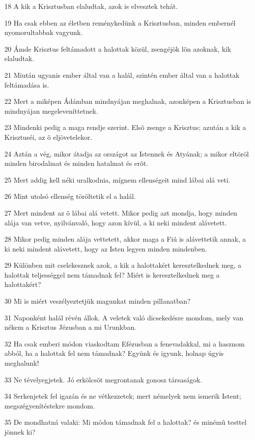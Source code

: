 \par 18 A kik a Krisztusban elaludtak, azok is elvesztek tehát.
\par 19 Ha csak ebben az életben reménykedünk a Krisztusban, minden embernél nyomorultabbak vagyunk.
\par 20 Ámde Krisztus feltámadott a halottak közül, zsengéjök  lõn azoknak, kik elaludtak.
\par 21 Miután ugyanis ember által van a halál, szintén ember által van a halottak feltámadása is.
\par 22 Mert a miképen Ádámban mindnyájan meghalnak, azonképen a Krisztusban is mindnyájan megeleveníttetnek.
\par 23 Mindenki pedig a maga rendje szerint. Elsõ zsenge a Krisztus; azután a kik a Krisztuséi,  az õ eljövetelekor.
\par 24 Aztán a vég, mikor átadja az országot az Istennek és Atyának; a mikor eltöröl minden birodalmat és minden hatalmat és erõt.
\par 25 Mert addig kell néki uralkodnia, mígnem ellenségeit mind lábai alá veti.
\par 26 Mint utolsó ellenség töröltetik el a halál.
\par 27 Mert mindent az õ lábai alá vetett. Mikor pedig azt mondja, hogy minden alája  van vetve, nyilvánvaló, hogy azon kívül, a ki neki mindent alávetett.
\par 28 Mikor pedig minden alája vettetett, akkor maga a Fiú is alávettetik annak, a ki neki mindent alávetett, hogy az Isten legyen minden mindenben.
\par 29 Különben mit cselekesznek azok, a kik a halottakért keresztelkednek meg, a halottak teljességgel nem támadnak fel? Miért is keresztelkednek meg a halottakért?
\par 30 Mi is miért veszélyeztetjük magunkat minden pillanatban?
\par 31 Naponként halál révén állok. A veletek való dicsekedésre  mondom, mely van nékem a Krisztus Jézusban a mi Urunkban.
\par 32 Ha csak emberi módon viaskodtam Efézusban a fenevadakkal, mi a hasznom abból, ha a halottak fel nem támadnak? Együnk és igyunk, holnap úgyis meghalunk!
\par 33 Ne tévelyegjetek. Jó erkölcsöt megrontanak gonosz  társaságok.
\par 34 Serkenjetek fel igazán és ne vétkezzetek; mert némelyek nem ismerik Istent; megszégyenítéstekre  mondom.
\par 35 De mondhatná valaki: Mi módon támadnak fel a halottak? és minémû testtel jönnek ki?
